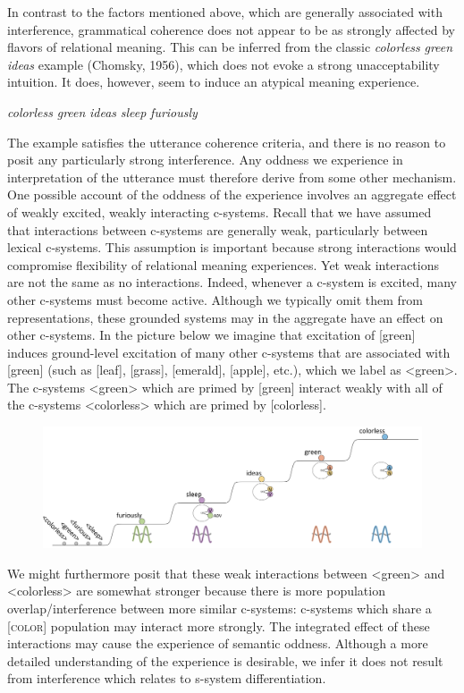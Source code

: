 In contrast to the factors mentioned above, which are generally associated with interference, grammatical coherence does not appear to be as strongly affected by flavors of relational meaning. This can be inferred from the classic \textit{colorless} \textit{green} \textit{ideas} example (Chomsky, 1956), which does not evoke a strong unacceptability intuition. It does, however, seem to induce an atypical meaning experience.

    \textit{colorless} \textit{green} \textit{ideas} \textit{sleep} \textit{furiously}

  The example satisfies the utterance coherence criteria, and there is no reason to posit any particularly strong interference. Any oddness we experience in interpretation of the utterance must therefore derive from some other mechanism. One possible account of the oddness of the experience involves an aggregate effect of weakly excited, weakly interacting c-systems. Recall that we have assumed that interactions between c-systems are generally weak, particularly between lexical c-systems. This assumption is important because strong interactions would compromise flexibility of relational meaning experiences. Yet weak interactions are not the same as no interactions. Indeed, whenever a c-system is excited, many other c-systems must become active. Although we typically omit them from representations, these grounded systems may in the aggregate have an effect on other c-systems. In the picture below we imagine that excitation of [green] induces ground-level excitation of many other c-systems that are associated with [green] (such as [leaf], [grass], [emerald], [apple], etc.), which we label as <green>. The c-systems <green> which are primed by [green] interact weakly with all of the c-systems <colorless> which are primed by [colorless]. 

  
\begin{figure}
\includegraphics[width=\textwidth]{figures/Tilsen-img134.png}
\caption{\missingcaption}
\label{fig:}
\end{figure}
 

  We might furthermore posit that these weak interactions between <green> and <colorless> are somewhat stronger because there is more population overlap/interference between more similar c-systems: c-systems which share a [\textsc{color}] population may interact more strongly. The integrated effect of these interactions may cause the experience of semantic oddness. Although a more detailed understanding of the experience is desirable, we infer it does not result from interference which relates to s-system differentiation.

